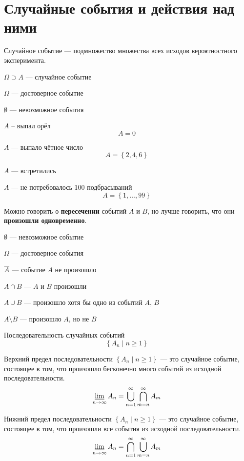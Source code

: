 \section{Случайные события и действия над ними}
\begin{definition}
Случайное событие --- подмножество множества всех исходов вероятностного эксперимента.
\end{definition}
$\Omega \supset A$ --- случайное событие

$\Omega$ --- достоверное событие

$\emptyset$ --- невозможное события

\begin{example}
$A$ -- выпал орёл
$$A={0}$$
\end{example}
\begin{example}
$A$ --- выпало чётное число
$$A = \left\{ 2,4,6 \right\}$$
\end{example}
\begin{example}
$A$ --- встретились
\end{example}
\begin{example}
$A$ --- не потребовалось 100 подбрасываний
$$A = \left\{ 1, \dots ,99 \right\}$$
\end{example}

Можно говорить о \textbf{пересечении} событий $A$ и $B$, но лучше говорить, что они \textbf{произошли одновременно}.

$\emptyset$ --- невозможное событие

$\Omega$ --- достоверное события

$\overline{A}$ --- событие $A$ не произошло

$A\cap B$ --- $A$ и $B$ произошли

$A\cup B$ --- произошло хотя бы одно из событий $A$, $B$

$A\setminus B$ --- произошло $A$, но не $B$

\begin{definition}
Последовательность случайных событий
$$\left\{A_n\mid n\geq 1\right\}$$
\end{definition}
\begin{definition}
Верхний предел последовательности $\left\{A_n\mid n\geq 1\right\}$ --- это случайное событие, состоящее в том, что произошло бесконечно много событий из исходной последовательности.
$$ \varliminf_{n \to \infty} A_n = \bigcup_{n=1}^{\infty} \bigcap_{m=n}^{\infty} A_m $$
\end{definition}
\begin{definition}
Нижний предел последовательности $\left\{A_n\mid n\geq 1\right\}$ --- это случайное событие, состоящее в том, что произошли все события из исходной последовательности.
$$ \varliminf_{n \to \infty} A_n = \bigcap_{n=1}^{\infty} \bigcup_{m=n}^{\infty} A_m $$
\end{definition}

